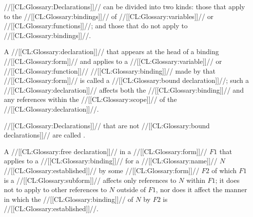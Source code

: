 \endsubsubsection%

\endSubsection%

















//[[CL:Glossary:Declarations]]// can be divided into two kinds: those that apply to the
//[[CL:Glossary:bindings]]// of //[[CL:Glossary:variables]]// or //[[CL:Glossary:functions]]//; and those that
do not apply to //[[CL:Glossary:bindings]]//.

A //[[CL:Glossary:declaration]]// that appears at the head of a binding //[[CL:Glossary:form]]// 
and applies to a //[[CL:Glossary:variable]]// or //[[CL:Glossary:function]]// //[[CL:Glossary:binding]]// 
made by that //[[CL:Glossary:form]]// is called a //[[CL:Glossary:bound declaration]]//; 
such a //[[CL:Glossary:declaration]]// affects both the //[[CL:Glossary:binding]]// and
any references within the //[[CL:Glossary:scope]]// of the //[[CL:Glossary:declaration]]//.  

//[[CL:Glossary:Declarations]]// that are not //[[CL:Glossary:bound declarations]]// are called
.



A //[[CL:Glossary:free declaration]]// in a //[[CL:Glossary:form]]// $F1$ that applies to a //[[CL:Glossary:binding]]//
for a //[[CL:Glossary:name]]// $N$ //[[CL:Glossary:established]]// by some //[[CL:Glossary:form]]// $F2$
of which $F1$ is a //[[CL:Glossary:subform]]//
affects only references to $N$ within $F1$; it does not to apply to
other references to $N$ outside of $F1$, nor does it affect the manner
in which the //[[CL:Glossary:binding]]// of $N$ by $F2$ is //[[CL:Glossary:established]]//.

